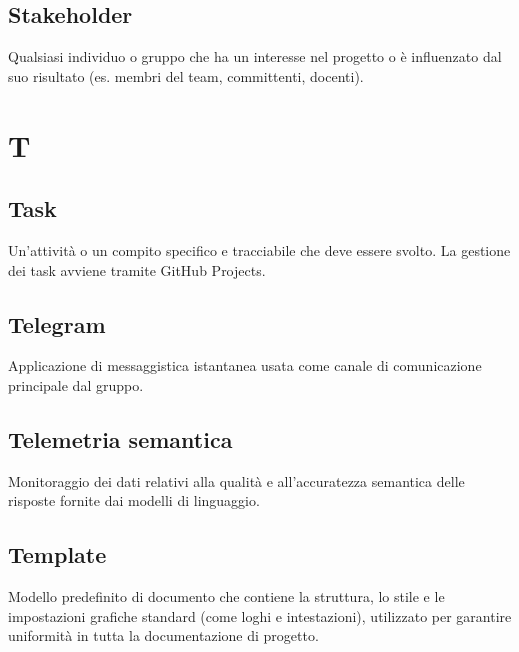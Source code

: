 \documentclass[a4paper, 11pt, oneside]{scrartcl} %
\begin{document}
\subsection*{Stakeholder}


Qualsiasi individuo o gruppo che ha un interesse nel progetto o è influenzato dal suo risultato (es. membri del team, committenti, docenti).

\vspace{0.5cm}



\section*{T}


\subsection*{Task}


Un'attività o un compito specifico e tracciabile che deve essere svolto. La gestione dei task avviene tramite GitHub Projects.

\vspace{0.5cm}

\subsection*{Telegram}


Applicazione di messaggistica istantanea usata come canale di comunicazione principale dal gruppo.

\vspace{0.5cm}

\subsection*{Telemetria semantica}
Monitoraggio dei dati relativi alla qualità e all'accuratezza semantica delle risposte fornite dai modelli di linguaggio.
\vspace{0.5cm}

\subsection*{Template}
Modello predefinito di documento che contiene la struttura, lo stile e le impostazioni grafiche standard (come loghi e intestazioni), utilizzato per garantire uniformità in tutta la documentazione di progetto.
\vspace{0.5cm}
\end{document}

